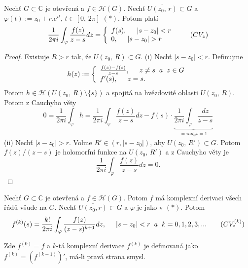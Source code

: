 
\begin{theorem}
Nechť $G\subset{\mathbb{C}}$ je otevřená a $f\in\mathcal{H}(G)$. Nechť $\overline{U(z_0,\, r)}\subset{G}$ a $\varphi{(t)}:=z_0+r.e^{it}$, $t\in{[0,\, 2\pi]}$ $(*)$. Potom platí 
\begin{equation}
    \frac{1}{2\pi{i}}\int_\varphi{\frac{f(z)}{z-s}dz}=
\left\{
	\begin{array}{ll}
		f(s), \hspace{5mm} |s-z_0|<r\\
		0,\hspace{5mm} |s-z_0|>r
	\end{array}
\right.
\tag{$CV_z$}
\label{eqn:cvz}
\end{equation}
\end{theorem}

\begin{proof}
Existuje $R>r$ tak, že $U(z_0,\, R)\subset{G}$.\newline
(i) Nechť $|s-z_0|<r$. Definujme 
\[h(z):=
\left\{
	\begin{array}{ll}
		\frac{f(z)-f(s)}{z-s},\hspace{5mm}z\neq{s}\hspace{2mm} a\hspace{2mm} z\in{G}\\
		f'(s),\hspace{5mm}z=s.
	\end{array}
\right.\]
Potom $h\in\mathcal{H}(U(z_0,\, R)\setminus\{s\})$ a spojitá na hvězdovité oblasti $U(z_0,\, R)$. Potom z Cauchyho věty 
\[0=
\frac{1}{2\pi{i}}\int_\varphi{h}=
\frac{1}{2\pi{i}}\int_\varphi{\frac{f(z)}{z-s}}dz-f(s)\cdot \underbrace{\frac{1}{2\pi{i}}\int_\varphi{\frac{dz}{z-s}}}_{=ind_\varphi{s} = 1}
\]
(ii) Nechť $|s-z_0|>r$. Volme $R'\in(r,|s-z_0|)$, aby $U(z_0,\, R')\subset{G}$. Potom $f(z)/(z-s)$ je holomorfní funkce na $U(z_0,\, R')$ a z Cauchyho věty je 
\[\frac{1}{2\pi{i}}\int_\varphi{\frac{f(z)}{z-s}}dz =0.\]
\end{proof}

\begin{consequence}
Nechť $G\subset{\mathbb{C}}$ je otevřená a $f\in\mathcal{H}(G)$. Potom $f$ má komplexní derivaci všech řádů všude na $G$. Nechť $\overline{U(z_0,r)}\subset{G}$ a $\varphi$ je jako v $(*)$. Potom 
\begin{equation}
f^{(k)}(s)=
\frac{k!}{2\pi{i}}\int_\varphi{\frac{f(z)}{(z-s)^{k+1}}}dz,\hspace{5mm} |s-z_0|<r\hspace{2mm} a\hspace{2mm} k = 0,1,2,3,... 
\tag{$CV^{(k)}_z$}
\label{eqn:cvkz}
\end{equation}

Zde $f^{(0)}=f$ a $k$-tá komplexní derivace $f^{(k)}$ je definovaná jako $f^{(k)}=(f^{(k-1)})'$, má-li pravá strana smysl.
\end{consequence}

